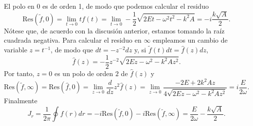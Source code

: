 \documentclass[11pt,a4paper,twoside]{article}
\theoremstyle{definition} \newtheorem{defn}[thm]{Definición}
\theoremstyle{definition} \newtheorem{ejemplo}[thm]{Ejemplo}
\theoremstyle{definition} \newtheorem{ejercicio}[thm]{Ejercicio}
\theoremstyle{remark} \newtheorem*{obs}{Observación}
\begin{document}
El polo en $0$ es de orden 1, de modo que podemos calcular el residuo
\begin{equation}
  \mathrm{Res}(\tilde{f},0)=\lim_{t\rightarrow 0} tf(t)=\lim_{t\rightarrow 0}-\frac{1}{2}\sqrt{2Et-\omega^2t^2-k^2A}=-i\frac{k\sqrt{A}}{2}.   
\end{equation}
Nótese que, de acuerdo con la discusión anterior, estamos tomando la raíz cuadrada negativa.
Para calcular el residuo en $\infty$ empleamos un cambio de variable $z=t^{-1}$, de modo que $dt=-z^{-2}dz$ y, si $\tilde{f}(t)dt=\hat{f}(z)dz$,
\begin{equation}
  \hat{f}(z)=-\frac{1}{2}z^{-2}\sqrt{2Ez-\omega^2-k^2Az^2}.
\end{equation}
Por tanto, $z=0$ es un polo de orden $2$ de $\hat{f}(z)$ y
\begin{equation}
  \mathrm{Res}(\tilde{f},\infty)=\mathrm{Res}(\hat{f},0)=\lim_{z\rightarrow 0}\frac{d}{d z}  z^2 \hat{f}(z)=\lim_{z\rightarrow 0}\frac{-2E+2k^2Az}{4\sqrt{2Ez-\omega^2-k^2Az^2}}=i\frac{E}{2\omega}. 
\end{equation}
Finalmente
\begin{equation}
  J_r=\frac{1}{2\pi}\oint f(r)dr=-i\mathrm{Res}(\tilde{f},0)-i\mathrm{Res}(\tilde{f},\infty)=\frac{E}{2\omega}-\frac{k\sqrt{A}}{2}. 
\end{equation}

\nocite{*}


\end{document}

